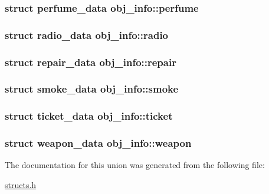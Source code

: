 \hypertarget{unionobj__info_a2bf9b1a07a23b823b21c7da48451ed5b}{
\subsubsection[{perfume}]{\setlength{\rightskip}{0pt plus 5cm}struct {\bf perfume\-\_\-data} obj\-\_\-info\-::perfume}}\label{unionobj__info_a2bf9b1a07a23b823b21c7da48451ed5b}
\hypertarget{unionobj__info_ac82a26a47808bdba4fd6675c9c7e4ee6}{
\subsubsection[{radio}]{\setlength{\rightskip}{0pt plus 5cm}struct {\bf radio\-\_\-data} obj\-\_\-info\-::radio}}\label{unionobj__info_ac82a26a47808bdba4fd6675c9c7e4ee6}
\hypertarget{unionobj__info_afefb2169a824b50e34e562ee46750598}{
\subsubsection[{repair}]{\setlength{\rightskip}{0pt plus 5cm}struct {\bf repair\-\_\-data} obj\-\_\-info\-::repair}}\label{unionobj__info_afefb2169a824b50e34e562ee46750598}
\hypertarget{unionobj__info_a97502f5e0508c9a90b5a98a572e8d315}{
\subsubsection[{smoke}]{\setlength{\rightskip}{0pt plus 5cm}struct {\bf smoke\-\_\-data} obj\-\_\-info\-::smoke}}\label{unionobj__info_a97502f5e0508c9a90b5a98a572e8d315}
\hypertarget{unionobj__info_a1156da6fafea13f363480a74c0c763f8}{
\subsubsection[{ticket}]{\setlength{\rightskip}{0pt plus 5cm}struct {\bf ticket\-\_\-data} obj\-\_\-info\-::ticket}}\label{unionobj__info_a1156da6fafea13f363480a74c0c763f8}
\hypertarget{unionobj__info_a329dd76db6d64e6f464da0a50e4e2e64}{
\subsubsection[{weapon}]{\setlength{\rightskip}{0pt plus 5cm}struct {\bf weapon\-\_\-data} obj\-\_\-info\-::weapon}}\label{unionobj__info_a329dd76db6d64e6f464da0a50e4e2e64}


The documentation for this union was generated from the following file\-:\begin{DoxyCompactItemize}
\item 
\hyperlink{structs_8h}{structs.\-h}\end{DoxyCompactItemize}
